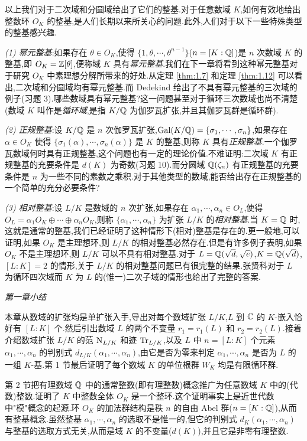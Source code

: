 以上我们对于二次域和分圆域给出了它们的整基.对于任意数域 $K$,如何有效地给出整数环 $O_K$ 的整基,是人们长期以来所关心的问题.此外,人们对于以下一些特殊类型的整基感兴趣.

\emph{(1) 幂元整基}:如果存在 $\theta\in O_K$,使得 $\{1,\theta,\cdots,\theta^{n-1}\}$($n=[K:\mathbb{Q}]$)是 $n$ 次数域 $K$ 的整基,即 $O_K=\mathbb{Z}[\theta]$,便称域 $K$ 具有\emph{幂元整基}.我们在下一章将看到这种幂元整基对于研究 $O_K$ 中素理想分解所带来的好处.从定理 \ref{thm:1.7} 和定理 \ref{thm:1.12} 可以看出,二次域和分圆域均有幂元整基.而 Dedekind 给出了不具有幂元整基的三次域的例子(习题 3).哪些数域具有幂元整基?这一问题甚至对于循环三次数域也尚不清楚(数域 $K$ 叫作是\emph{循环域},是指 $K/\mathbb{Q}$ 为伽罗瓦扩张,并且其伽罗瓦群是循环群).

\emph{(2) 正规整基}:设 $K/\mathbb{Q}$ 是 $n$ 次伽罗瓦扩张,$\operatorname{Gal}(K/\mathbb{Q})=\{\sigma_1,\cdots,\sigma_n\}$,如果存在 $\alpha\in O_K$ 使得 $\{\sigma_1(\alpha),\cdots,\sigma_n(\alpha)\}$ 是 $K$ 的整基,则称 $K$ 具有\emph{正规整基}.一个伽罗瓦数域何时具有正规整基,这个问题也有一定的理论价值.不难证明:二次域 $K$ 有正规整基的充要条件是 $d(K)$ 为奇数(习题 10).而分圆域 $\mathbb{Q}(\zeta_n)$ 有正规整基的充要条件是 $n$ 为一些不同的素数之乘积.对于其他类型的数域,能否给出存在正规整基的一个简单的充分必要条件?

\emph{(3) 相对整基}:设 $L/K$ 是数域的 $n$ 次扩张,如果存在 $\alpha_1,\cdots,\alpha_n\in O_L$,使得 $O_L=\alpha_1O_K\oplus\cdots\oplus\alpha_nO_K$,则称 $\{\alpha_1,\cdots,\alpha_n\}$ 为扩张 $L/K$ 的\emph{相对整基}.当 $K=\mathbb{Q}$ 时,这就是通常的整基,我们已经证明了这种情形下(相对)整基是存在的.更一般地,可以证明,如果 $O_K$ 是主理想环,则 $L/K$ 的相对整基必然存在.但是有许多例子表明,如果 $O_K$ 不是主理想环,则 $L/K$ 可以不具有相对整基.对于 $L=\mathbb{Q}(\sqrt{d},\sqrt{e})$,$K=\mathbb{Q}(\sqrt{d})$,$[L:K]=2$ 的情形,关于 $L/K$ 的相对整基问题已有很完整的结果.张贤科对于 $L$ 为循环四次域而 $K$ 为 $L$ 的(惟一)二次子域的情形也给出了完整的答案.

\medskip
\noindent\emph{第一章小结}

本章从数域的扩张均是单扩张入手,导出对每个数域扩张 $L/K$,$L$ 到 $\mathbb{C}$ 的 $K$-嵌入恰好有 $[L:K]$ 个.然后引出数域 $L$ 的两个不变量 $r_1=r_1(L)$ 和 $r_2=r_2(L)$.接着介绍数域扩张 $L/K$ 的范 $\mathrm{N}_{L/K}$ 和迹 $\mathrm{Tr}_{L/K}$,以及 $L$ 中 $n=[L:K]$ 个元素 $\alpha_1,\cdots,\alpha_n$ 的判别式 $d_{L/K}(\alpha_1,\cdots,\alpha_n)$,由它是否为零来判定 $\alpha_1,\cdots,\alpha_n$ 是否为 $L$ 的一组 $K$-基.第 1 节最后证明了每个数域 $K$ 的单位根群 $W_K$ 均是有限循环群.

第 2 节把有理数域 $\mathbb{Q}$ 中的通常整数(即有理整数)概念推广为任意数域 $K$ 中的(代数)整数.证明了 $K$ 中整数全体 $O_K$ 是一个整环.这个证明事实上是近世代数中"模"概念的起源.环 $O_K$ 的加法群结构是秩 $n$ 的自由 Abel 群($n=[K:\mathbb{Q}]$),从而有整基概念.虽然整基 $\alpha_1,\cdots,\alpha_n$ 的选取不是惟一的,但它的判别式 $d_K(\alpha_1,\cdots,\alpha_n)$ 与整基的选取方式无关,从而是域 $K$ 的不变量($d(K)$),并且它是非零有理整数.

